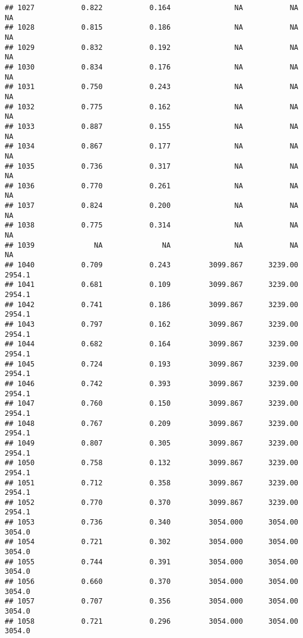 \documentclass[
]{article}
\begin{document}
\begin{verbatim}
## 1027           0.822           0.164               NA           NA           NA
## 1028           0.815           0.186               NA           NA           NA
## 1029           0.832           0.192               NA           NA           NA
## 1030           0.834           0.176               NA           NA           NA
## 1031           0.750           0.243               NA           NA           NA
## 1032           0.775           0.162               NA           NA           NA
## 1033           0.887           0.155               NA           NA           NA
## 1034           0.867           0.177               NA           NA           NA
## 1035           0.736           0.317               NA           NA           NA
## 1036           0.770           0.261               NA           NA           NA
## 1037           0.824           0.200               NA           NA           NA
## 1038           0.775           0.314               NA           NA           NA
## 1039              NA              NA               NA           NA           NA
## 1040           0.709           0.243         3099.867      3239.00       2954.1
## 1041           0.681           0.109         3099.867      3239.00       2954.1
## 1042           0.741           0.186         3099.867      3239.00       2954.1
## 1043           0.797           0.162         3099.867      3239.00       2954.1
## 1044           0.682           0.164         3099.867      3239.00       2954.1
## 1045           0.724           0.193         3099.867      3239.00       2954.1
## 1046           0.742           0.393         3099.867      3239.00       2954.1
## 1047           0.760           0.150         3099.867      3239.00       2954.1
## 1048           0.767           0.209         3099.867      3239.00       2954.1
## 1049           0.807           0.305         3099.867      3239.00       2954.1
## 1050           0.758           0.132         3099.867      3239.00       2954.1
## 1051           0.712           0.358         3099.867      3239.00       2954.1
## 1052           0.770           0.370         3099.867      3239.00       2954.1
## 1053           0.736           0.340         3054.000      3054.00       3054.0
## 1054           0.721           0.302         3054.000      3054.00       3054.0
## 1055           0.744           0.391         3054.000      3054.00       3054.0
## 1056           0.660           0.370         3054.000      3054.00       3054.0
## 1057           0.707           0.356         3054.000      3054.00       3054.0
## 1058           0.721           0.296         3054.000      3054.00       3054.0

\end{verbatim}
\end{document}
